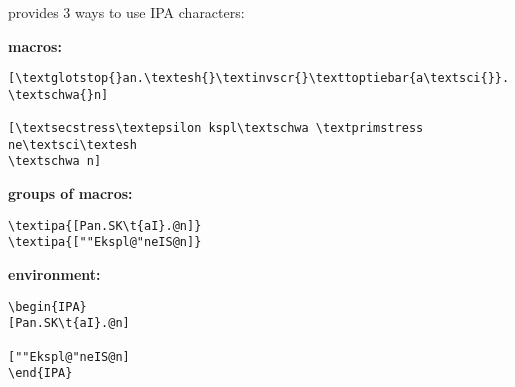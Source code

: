 \begin{frame}[fragile]

 provides 3 ways to use IPA characters:


\textbf{macros:}

\begin{lstlisting}
[\textglotstop{}an.\textesh{}\textinvscr{}\texttoptiebar{a\textsci{}}.
\textschwa{}n]

[\textsecstress\textepsilon kspl\textschwa \textprimstress ne\textsci\textesh
\textschwa n]
\end{lstlisting}

\vspace{-.25cm}

\begin{multicols}{2}

\z 
\end{multicols}


\textbf{groups of macros:}

\vspace{-.25cm}

\begin{multicols}{2}
\begin{lstlisting}
\textipa{[Pan.SK\t{aI}.@n]} 
\textipa{[""Ekspl@"neIS@n]}
\end{lstlisting}


\ea \textipa{[Pan.SK\t{aI}.@n]}

\ex {}	
\z 	
\end{multicols}


\textbf{ environment:}

\vspace{-.25cm}

\begin{multicols}{2}
	
\begin{lstlisting}
\begin{IPA}
[Pan.SK\t{aI}.@n]

[""Ekspl@"neIS@n]
\end{IPA}
\end{lstlisting}


\ea	\begin{IPA}
[Pan.SK\t{aI}.@n]
\end{IPA}

\ex \begin{IPA} 
\end{IPA}
\z
\end{multicols}

\nocite{Rei04a}

\nocite{Linke05a}

\end{frame}


